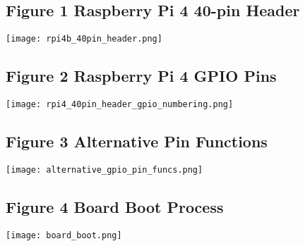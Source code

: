 \documentclass[journal]{IEEEtran}
\begin{document}
      \subsection{Figure 1 Raspberry Pi 4 40-pin Header}

      \texttt{[image: rpi4b\_40pin\_header.png]}

      \subsection{Figure 2 Raspberry Pi 4 GPIO Pins}

      \texttt{[image: rpi4\_40pin\_header\_gpio\_numbering.png]}

      \subsection{Figure 3 Alternative Pin Functions}

      \texttt{[image: alternative\_gpio\_pin\_funcs.png]}

      \subsection{Figure 4 Board Boot Process}

      \texttt{[image: board\_boot.png]}
    
\end{document}
